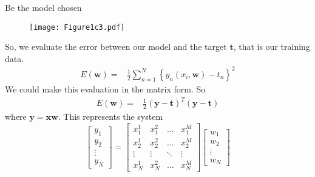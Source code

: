 \begin{frame}{\insertsubsection}

Be the model chosen 
\end{frame}

\begin{frame}{\insertsubsection}
	\begin{figure}
		\texttt{[image: Figure1c3.pdf]}
	\end{figure}
\end{frame}

\begin{frame}{\insertsubsection}
So, we evaluate the error between our model and the target $\mathbf{t}$, that is our training data.
\begin{align}
	E(\mathbf{w}) =& \frac{1}{2} \sum_{n=1}^N \left\{ y_n(x_i,\mathbf{w}) -  t_n \right\}^2
\end{align}
%
We could make this evaluation in the matrix form. So
%
\begin{align}
E(\mathbf{w}) =& \frac{1}{2} \left( \mathbf{y} - \mathbf{t} \right)^T\left( \mathbf{y} - \mathbf{t} \right)
\end{align}
where $\mathbf{y} = \mathbf{x}\mathbf{w}$. This represents the system
\begin{equation}
\begin{bmatrix}
y_1 \\ y_2 \\  \vdots \\ y_N
\end{bmatrix} = 
\begin{bmatrix}
x_1^1 & x_1^2 & ... & x_1^M   \\ 
x_2^1 & x_2^2 & ... & x_2^M   \\ 
\vdots & \vdots & \ddots & \vdots \\
x_N^1 & x_N^2 & ... & x_N^M   
\end{bmatrix}
\begin{bmatrix}
w_1 \\ w_2 \\  \vdots \\ w_N
\end{bmatrix}
\end{equation}

\end{frame}

